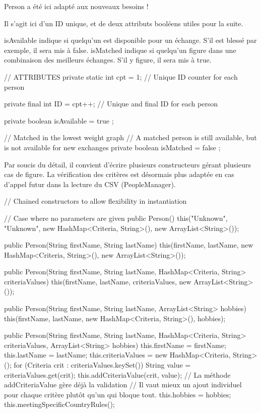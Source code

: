 \documentclass{mytex}
\begin{document}
Person a été ici adapté aux nouveaux besoins !


Il s'agit ici d'un ID unique, et de deux attributs booléens utiles pour la suite.

isAvailable indique si quelqu'un est disponible pour un échange. S'il est blessé par exemple, il sera mis à false.
isMatched indique si quelqu'un figure dans une combinaison des meilleurs échanges. S'il y figure, il sera mis à true.

\begin{codebox}
// ATTRIBUTES
private static int cpt = 1; // Unique ID counter for each person

private final int ID = cpt++; // Unique and final ID for each person

private boolean isAvailable = true ; 

// Matched in the lowest weight graph
// A matched person is still available, but is not available for new exchanges
private boolean isMatched = false ; 
\end{codebox}


Par soucis du détail, il convient d'écrire plusieurs constructeurs gérant plusieurs cas de figure.
La vérification des critères est désormais plus adaptée en cas d'appel futur dans la lecture du CSV (PeopleManager).

\begin{codebox}
// Chained constructors to allow flexibility in instantiation

// Case where no parameters are given
public Person() {
	this("Unknown", "Unknown", new HashMap<Criteria, String>(), new ArrayList<String>());
}

public Person(String firstName, String lastName) {
	this(firstName, lastName, new HashMap<Criteria, String>(), new ArrayList<String>());
}

public Person(String firstName, String lastName, HashMap<Criteria, String> criteriaValues) {
	this(firstName, lastName, criteriaValues, new ArrayList<String>());
}

public Person(String firstName, String lastName, ArrayList<String> hobbies) {
	this(firstName, lastName, new HashMap<Criteria, String>(), hobbies);
}

public Person(String firstName, String lastName, HashMap<Criteria, String> criteriaValues, ArrayList<String> hobbies) {
	this.firstName = firstName;
	this.lastName = lastName;
	this.criteriaValues = new HashMap<Criteria, String>();
	for (Criteria crit : criteriaValues.keySet()) {
		String value = criteriaValues.get(crit);
		this.addCriteriaValue(crit, value);
		// La méthode addCriteriaValue gère déjà la validation
		// Il vaut mieux un ajout individuel pour chaque critère plutôt qu'un qui bloque tout.
	}
	this.hobbies = hobbies;
	this.meetingSpecificCountryRules();
}
\end{codebox}
\end{document}
